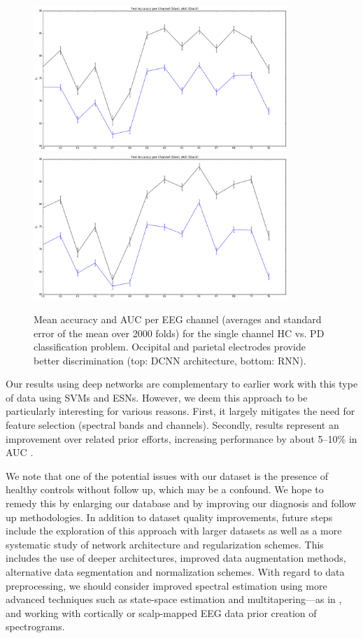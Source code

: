 \documentclass[review]{elsarticle}
\begin{document}
\begin{figure}
	\centering
	\includegraphics[height=5.5cm]{figures/DNN}
		\includegraphics[height=5.5cm]{figures/RNN}
	\caption{Mean accuracy and AUC per EEG channel (averages and standard error of the mean over 2000 folds) for the single channel HC vs. PD classification problem. Occipital and parietal electrodes provide better discrimination (top: DCNN architecture, bottom: RNN).}
	\label{fig:perchannel}
\end{figure}



Our results using deep networks are complementary to earlier work with this type of data using SVMs and ESNs. However, we deem this approach to be particularly interesting for various reasons. First, it largely mitigates the need for feature selection (spectral bands and channels). Secondly, results represent an improvement over related prior efforts, increasing performance by about 5--10\% in AUC \cite{Soria2014:aa,Soria2016:aa}. 

We note that one of the potential issues with our dataset is the presence of healthy controls without follow up, which may be a confound. We hope to remedy this by enlarging our database and by improving our diagnosis and follow up methodologies.
In addition to dataset quality improvements, future steps include the exploration of this approach with larger datasets as well as a more systematic study of network architecture and regularization schemes. This includes the use of deeper architectures, improved data augmentation methods, 
alternative data segmentation and normalization schemes. With regard to data preprocessing, we should consider 
improved spectral estimation using more advanced techniques such as state-space estimation and multitapering---as in \cite{kims:2017aa}, and 
working with cortically or scalp-mapped EEG data prior creation of spectrograms. 
\end{document}
